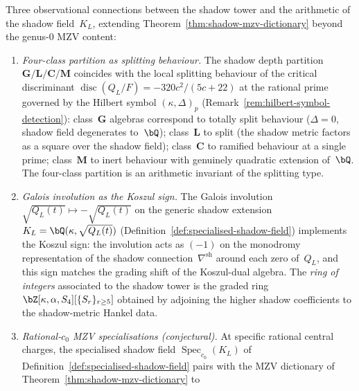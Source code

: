 \begin{remark}%
\label{rem:shadow-mzv-observational}%
%
%
Three observational connections between the shadow tower and
the arithmetic of the shadow field~$K_L$, extending
Theorem~\textup{\ref{thm:shadow-mzv-dictionary}} beyond the
genus-$0$ MZV content:
\begin{enumerate}[label=\textup{(\roman*)}]
\item
\emph{Four-class partition as splitting behaviour.}\enspace
The shadow depth partition
$\mathbf{G}/\mathbf{L}/\mathbf{C}/\mathbf{M}$
coincides with the local splitting behaviour of the
critical discriminant
$\operatorname{disc}(Q_L/F) = -320c^2/(5c{+}22)$
at the rational prime governed by the Hilbert symbol
$(\kappa, \Delta)_p$
\textup{(}Remark~\textup{\ref{rem:hilbert-symbol-detection}}\textup{)}:
class~$\mathbf{G}$ algebras correspond to totally split
behaviour \textup{(}$\Delta = 0$, shadow field degenerates
to~$\bQ$\textup{)}; class~$\mathbf{L}$ to split
\textup{(}the shadow metric factors as a square over the
shadow field\textup{)}; class~$\mathbf{C}$ to ramified
behaviour at a single prime; class~$\mathbf{M}$ to
inert behaviour with genuinely quadratic extension
of~$\bQ$. The four-class partition is an arithmetic
invariant of the splitting type.
\item
\emph{Galois involution as the Koszul sign.}\enspace
The Galois involution
$\sqrt{Q_L(t)} \mapsto -\sqrt{Q_L(t)}$
on the generic shadow extension
$K_L = \bQ(\kappa, \sqrt{Q_L(t)})$
\textup{(}Definition~\textup{\ref{def:specialised-shadow-field}}\textup{)}
implements the Koszul sign: the involution acts as
$(-1)$ on the monodromy representation of the shadow
connection~$\nabla^{\mathrm{sh}}$ around each zero
of~$Q_L$, and this sign matches the grading shift of
the Koszul-dual algebra. The \emph{ring of integers}
associated to the shadow tower is the graded ring
$\bZ[\kappa, \alpha, S_4][\{S_r\}_{r \geq 5}]$
obtained by adjoining the higher shadow coefficients
to the shadow-metric Hankel data.
\item
\emph{Rational-$c_0$ MZV specialisations
\textup{(}conjectural\textup{)}.}\enspace
At specific rational central charges, the specialised
shadow field $\operatorname{Spec}_{c_0}(K_L)$ of
Definition~\textup{\ref{def:specialised-shadow-field}}
pairs with the MZV dictionary of
Theorem~\textup{\ref{thm:shadow-mzv-dictionary}} to

\end{enumerate}
\end{remark}
